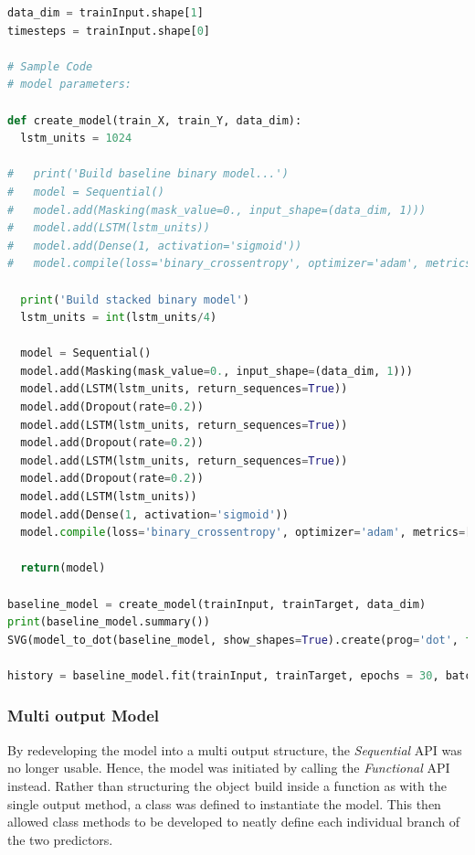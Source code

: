 \documentclass[10pt,onecolumn,letterpaper]{article}
\begin{document}
\begin{lstlisting}[language=Python, breaklines=true, caption={Model creation, compilation and fitting functionality of the single output model. The initial single hidden layer model is commented out.}]
data_dim = trainInput.shape[1]
timesteps = trainInput.shape[0]

# Sample Code
# model parameters:

def create_model(train_X, train_Y, data_dim):
  lstm_units = 1024
  
#   print('Build baseline binary model...')
#   model = Sequential()
#   model.add(Masking(mask_value=0., input_shape=(data_dim, 1)))
#   model.add(LSTM(lstm_units))
#   model.add(Dense(1, activation='sigmoid'))
#   model.compile(loss='binary_crossentropy', optimizer='adam', metrics=['accuracy'])
  
  print('Build stacked binary model')
  lstm_units = int(lstm_units/4)

  model = Sequential()
  model.add(Masking(mask_value=0., input_shape=(data_dim, 1)))
  model.add(LSTM(lstm_units, return_sequences=True))
  model.add(Dropout(rate=0.2))
  model.add(LSTM(lstm_units, return_sequences=True))
  model.add(Dropout(rate=0.2))
  model.add(LSTM(lstm_units, return_sequences=True))
  model.add(Dropout(rate=0.2))
  model.add(LSTM(lstm_units))
  model.add(Dense(1, activation='sigmoid'))
  model.compile(loss='binary_crossentropy', optimizer='adam', metrics=['accuracy'])

  return(model)

baseline_model = create_model(trainInput, trainTarget, data_dim)
print(baseline_model.summary())
SVG(model_to_dot(baseline_model, show_shapes=True).create(prog='dot', format='svg'))

history = baseline_model.fit(trainInput, trainTarget, epochs = 30, batch_size = 1024, verbose = 1)

\end{lstlisting} 

\subsubsection{Multi output Model}

By redeveloping the model into a multi output structure, the \textit{Sequential} API was no longer usable. Hence, the model was initiated by calling the \textit{Functional} API instead. Rather than structuring the object build inside a function as with the single output method, a class was defined to instantiate the model. This then allowed class methods to be developed to neatly define each individual branch of the two predictors. 
\end{document}
